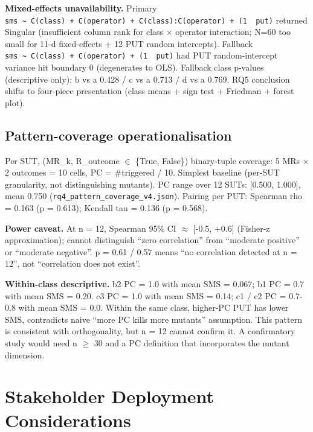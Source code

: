 \documentclass[manuscript,screen,review]{acmart}
\begin{document}
\textbf{Mixed-effects unavailability.} Primary
\texttt{sms\ \textasciitilde{}\ C(class)\ +\ C(operator)\ +\ C(class):C(operator)\ +\ (1\ \textbar{}\ put)}
returned Singular (insufficient column rank for class $\times$ operator
interaction; N=60 too small for 11-d fixed-effects + 12 PUT random
intercepts). Fallback
\texttt{sms\ \textasciitilde{}\ C(class)\ +\ C(operator)\ +\ (1\ \textbar{}\ put)}
had PUT random-intercept variance hit boundary 0 (degenerates to OLS).
Fallback class p-values (descriptive only): b vs a 0.428 / c vs a 0.713
/ d vs a 0.769. RQ5 conclusion shifts to four-piece presentation (class
means + sign test + Friedman + forest plot).

\subsection{Pattern-coverage operationalisation}\label{d.5-pattern-coverage-operationalisation}

Per SUT, (MR\_k, R\_outcome $\in$ \{True, False\}) binary-tuple coverage: 5
MRs $\times$ 2 outcomes = 10 cells, PC = \#triggered / 10. Simplest baseline
(per-SUT granularity, not distinguishing mutants). PC range over 12
SUTs: {[}0.500, 1.000{]}, mean 0.750 (\texttt{rq4\_pattern\_coverage\_v4.json}).
Pairing per PUT: Spearman rho = 0.163 (p = 0.613); Kendall tau = 0.136
(p = 0.568).

\textbf{Power caveat.} At n = 12, Spearman 95\% CI $\approx$ {[}-0.5, +0.6{]}
(Fisher-z approximation); cannot distinguish ``zero correlation'' from ``moderate positive'' or
``moderate negative''. p = 0.61 / 0.57 means ``no correlation detected
at n = 12'', not ``correlation does not exist''.

\textbf{Within-class descriptive.} b2 PC = 1.0 with mean SMS = 0.067; b1
PC = 0.7 with mean SMS = 0.20. c3 PC = 1.0 with mean SMS = 0.14; c1 / c2
PC = 0.7-0.8 with mean SMS = 0.0. Within the same class, higher-PC PUT
has lower SMS, contradicts naive ``more PC kills more mutants''
assumption. This pattern is consistent with orthogonality, but n = 12
cannot confirm it. A confirmatory study would need n $\geq$ 30 and a PC
definition that incorporates the mutant dimension.


\section{Stakeholder Deployment Considerations}\label{e.-stakeholder-deployment-considerations-single-output-kernels-scope}
\end{document}
